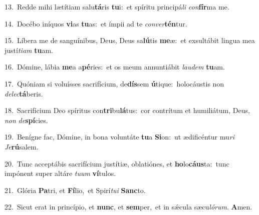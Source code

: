 {\numbfont\textcolor{\numbcolor}{13.}}~Redde mihi lætítiam salu\-\textbf{tá}\-ris \textbf{tu}\-i:~\star et spíritu principá\textit{li} \textit{con}\-\textbf{fír}ma me.\par
{\numbfont\textcolor{\numbcolor}{14.}}~Docébo iníquos \textbf{vi}\-as \textbf{tu}\-as:~\star et ímpii ad te \textit{con}\-\textit{ver}\textbf{tén}tur.\par
{\numbfont\textcolor{\numbcolor}{15.}}~Líbera me de sanguínibus, Deus, Deus sa\-\textbf{lú}\-tis \textbf{me}\-æ:~\star et exsultábit lingua mea justí\-\textit{ti}\-\textit{am} \textbf{tu}\-am.\par
{\numbfont\textcolor{\numbcolor}{16.}}~Dómine, lábia \textbf{me}\-a a\-\textbf{pé}\-ries:~\star et os meum annuntiábit \textit{lau}\-\textit{dem} \textbf{tu}\-am.\par
{\numbfont\textcolor{\numbcolor}{17.}}~Quóniam si voluísses sacrifícium, de\-\textbf{dís}\-sem \textbf{ú}\-tique:~\star holocáustis non \textit{de}\-\textit{lec}\textbf{tá}beris.\par
{\numbfont\textcolor{\numbcolor}{18.}}~Sacrifícium Deo spíritus con\-\textbf{tri}\-bu\-\textbf{lá}\-tus:~\star cor contrítum et humiliátum, Deus, \textit{non} \textit{de}\-\textbf{spí}cies.\par
{\numbfont\textcolor{\numbcolor}{19.}}~Benígne fac, Dómine, in bona voluntáte \textbf{tu}\-a \textbf{Si}\-on:~\star ut ædificéntur mu\textit{ri} \textit{Je}\-\textbf{rú}salem.\par
{\numbfont\textcolor{\numbcolor}{20.}}~Tunc acceptábis sacrifícium justítiæ, oblatiónes, et \textbf{ho}\-lo\-\textbf{cáus}\-ta:~\star tunc impónent super altáre \textit{tu}\-\textit{um} \textbf{ví}\-tulos.\par
{\numbfont\textcolor{\numbcolor}{21.}}~Glória \textbf{Pa}\-tri, et \textbf{Fí}\-lio,~\star et Spirí\-\textit{tu}\-\textit{i} \textbf{Sanc}\-to.\par
{\numbfont\textcolor{\numbcolor}{22.}}~Sicut erat in princípio, et \textbf{nunc}\-, et \textbf{sem}\-per,~\star et in sǽcula sæcu\-\textit{ló}\-\textit{rum}. \textbf{A}\-men.\par
